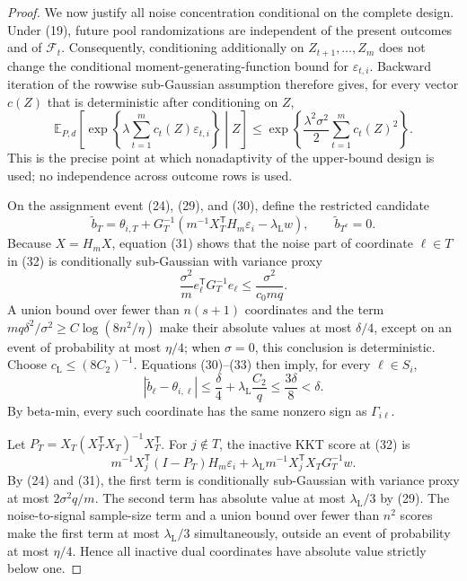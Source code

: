\documentclass{article}
\begin{document}
\begin{proof}
We now justify all noise concentration conditional on the complete design.  Under (19), future pool randomizations are independent of the present outcomes and of \(\mathcal F_t\).  Consequently, conditioning additionally on \(Z_{t+1},\ldots,Z_m\) does not change the conditional moment-generating-function bound for \(\varepsilon_{t,i}\).  Backward iteration of the rowwise sub-Gaussian assumption therefore gives, for every vector \(c(Z)\) that is deterministic after conditioning on \(Z\),
\[
 \mathbb E_{P,d}\!\left[\exp\!\left\{\lambda\sum_{t=1}^m c_t(Z)\varepsilon_{t,i}\right\}\middle|Z\right]
 \le\exp\!\left\{\frac{\lambda^2\sigma^2}{2}\sum_{t=1}^mc_t(Z)^2\right\}. \tag{31}
\]
This is the precise point at which nonadaptivity of the upper-bound design is used; no independence across outcome rows is used.

On the assignment event (24), (29), and (30), define the restricted candidate
\[
 \widetilde b_T=\theta_{i,T}
 +G_T^{-1}\left(m^{-1}X_T^{\mathsf T}H_m\varepsilon_i
                   -\lambda_{\mathrm L}w\right),
 \qquad \widetilde b_{T^c}=0. \tag{32}
\]
Because \(X=H_mX\), equation (31) shows that the noise part of coordinate \(\ell\in T\) in (32) is conditionally sub-Gaussian with variance proxy
\[
 \frac{\sigma^2}{m}e_\ell^{\mathsf T}G_T^{-1}e_\ell
 \le\frac{\sigma^2}{c_0mq}. \tag{33}
\]
A union bound over fewer than \(n(s+1)\) coordinates and the term
\(mq\delta^2/\sigma^2\ge C\log(8n^2/\eta)\) make their absolute values at most \(\delta/4\), except on an event of probability at most \(\eta/4\); when \(\sigma=0\), this conclusion is deterministic.  Choose \(c_{\mathrm L}\le(8C_2)^{-1}\).  Equations (30)--(33) then imply, for every \(\ell\in S_i\),
\[
 |\widetilde b_\ell-\theta_{i,\ell}|
 \le\frac\delta4+\lambda_{\mathrm L}\frac{C_2}{q}
 \le\frac{3\delta}{8}<\delta. \tag{34}
\]
By beta-min, every such coordinate has the same nonzero sign as \(\Gamma_{i\ell}\).

Let \(P_T=X_T(X_T^{\mathsf T}X_T)^{-1}X_T^{\mathsf T}\).  For \(j\notin T\), the inactive KKT score at (32) is
\[
 m^{-1}X_j^{\mathsf T}(I-P_T)H_m\varepsilon_i
 +\lambda_{\mathrm L}m^{-1}X_j^{\mathsf T}X_TG_T^{-1}w. \tag{35}
\]
By (24) and (31), the first term is conditionally sub-Gaussian with variance proxy at most \(2\sigma^2q/m\).  The second term has absolute value at most \(\lambda_{\mathrm L}/3\) by (29).  The noise-to-signal sample-size term and a union bound over fewer than \(n^2\) scores make the first term at most \(\lambda_{\mathrm L}/3\) simultaneously, outside an event of probability at most \(\eta/4\).  Hence all inactive dual coordinates have absolute value strictly below one.


\end{proof}
\end{document}
